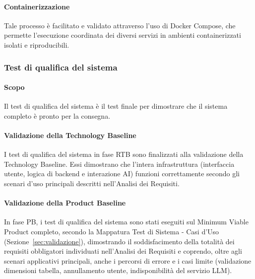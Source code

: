 \paragraph{Containerizzazione}

Tale processo è facilitato e validato attraverso l'uso di Docker Compose, che permette l'esecuzione coordinata dei diversi servizi in ambienti containerizzati isolati e riproducibili.


\subsubsection{Test di qualifica del sistema}

\paragraph{Scopo}

Il test di qualifica del sistema è il test finale per dimostrare che il sistema completo è pronto per la consegna.

\paragraph{Validazione della Technology Baseline}

I test di qualifica del sistema in fase RTB sono finalizzati alla validazione della Technology Baseline. Essi dimostrano che l'intera infrastruttura (interfaccia utente, logica di backend e interazione AI) funzioni correttamente secondo gli scenari d'uso principali descritti nell'Analisi dei Requisiti.

\paragraph{Validazione della Product Baseline}

In fase PB, i test di qualifica del sistema sono stati eseguiti sul Minimum Viable Product completo, secondo la Mappatura Test di Sistema - Casi d'Uso (Sezione~\ref{sec:validazione}), dimostrando il soddisfacimento della totalità dei requisiti obbligatori individuati nell'Analisi dei Requisiti e coprendo, oltre agli scenari applicativi principali, anche i percorsi di errore e i casi limite (validazione dimensioni tabella, annullamento utente, indisponibilità del servizio LLM).


